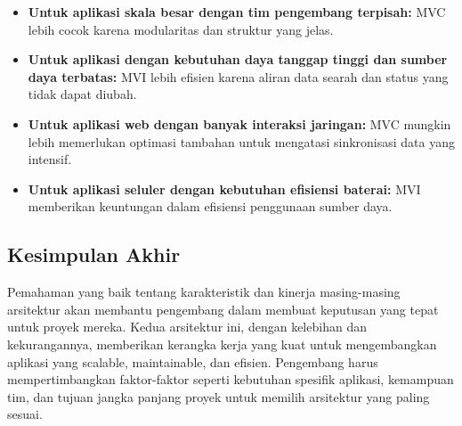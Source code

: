 \documentclass[conference]{IEEEtran}
\begin{document}
\begin{itemize}
    \item \textbf{Untuk aplikasi skala besar dengan tim pengembang terpisah:} MVC lebih cocok karena modularitas dan struktur yang jelas.
    \item \textbf{Untuk aplikasi dengan kebutuhan daya tanggap tinggi dan sumber daya terbatas:} MVI lebih efisien karena aliran data searah dan status yang tidak dapat diubah.
    \item \textbf{Untuk aplikasi web dengan banyak interaksi jaringan:} MVC mungkin lebih memerlukan optimasi tambahan untuk mengatasi sinkronisasi data yang intensif.
    \item \textbf{Untuk aplikasi seluler dengan kebutuhan efisiensi baterai:} MVI memberikan keuntungan dalam efisiensi penggunaan sumber daya.
\end{itemize}

\subsection{Kesimpulan Akhir}

Pemahaman yang baik tentang karakteristik dan kinerja masing-masing arsitektur akan membantu pengembang dalam membuat keputusan yang tepat untuk proyek mereka. Kedua arsitektur ini, dengan kelebihan dan kekurangannya, memberikan kerangka kerja yang kuat untuk mengembangkan aplikasi yang scalable, maintainable, dan efisien. Pengembang harus mempertimbangkan faktor-faktor seperti kebutuhan spesifik aplikasi, kemampuan tim, dan tujuan jangka panjang proyek untuk memilih arsitektur yang paling sesuai.
\section*{}


\end{document}
